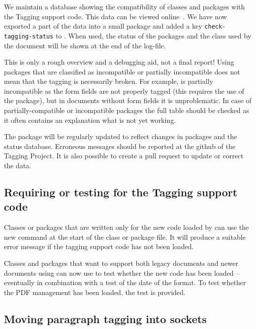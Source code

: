 \documentclass{ltnews}
\begin{document}
We maintain a database showing the compatibility of classes and
packages with the Tagging support code. This data can be viewed
online~\cite{tagging-status}.  We have now exported a part of the data
into a small package  and added a key
\texttt{check-tagging-status} to .  When used, the
status of the packages and the class used by the document will be
shown at the end of the log-file.

This is only a rough overview and a debugging aid, not a final report!
Using packages that are classified as incompatible or partially
incompatible does not mean that the tagging is necessarily broken. For
example,  is partially incompatible as the form fields
are not properly tagged (this requires the use of the 
package), but in documents without form fields it is unproblematic.
In case of partially-compatible or incompatible packages the full
table should be checked as it often contains an explanation what is
not yet working.
    
The package  will be regularly updated to
reflect changes in packages and the status database. Erroneous
messages should be reported at the github of the Tagging
Project\cite{tagging-project}. It is also possible to create a pull
request to update or correct the data.


\subsection{Requiring or testing for the Tagging support code}

Classes or packages that are written only for the new code loaded by
 can use the new command
 at the start of the class or package
file. It will produce a suitable error message if the tagging support
code has not been loaded.

Classes and packages that want to support both legacy documents and
newer documents using  can now use
 to test whether the new code has been loaded
-- eventually in combination with a test of the date of the format. To
test whether the PDF management has been loaded, the test
 is provided.

 
\subsection{Moving paragraph tagging into sockets}
\end{document}
